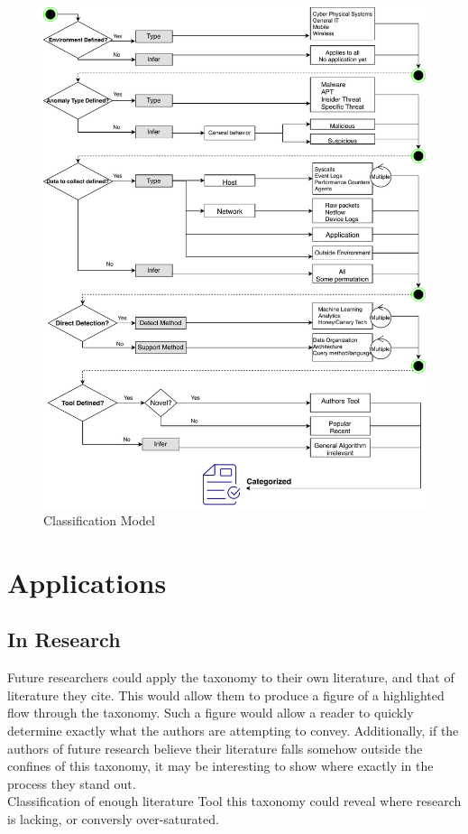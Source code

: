\documentclass[10pt]{IEEEtran}
\begin{document}
\begin{figure}
  \includegraphics[width=\textwidth]{logicdiagram.pdf}
  \caption{Classification Model}
\end{figure}

\section{Applications}
\subsection{In Research}
Future researchers could apply the taxonomy to their own literature, and that of literature they cite. This would allow them to produce a figure of a highlighted flow through the taxonomy. Such a figure would allow a reader to quickly determine exactly what the authors are attempting to convey. Additionally, if the authors of future research believe their literature falls somehow outside the confines of this taxonomy, it may be interesting to show where exactly in the process they stand out.\\ Classification of enough literature Tool this taxonomy could reveal where research is lacking, or conversly over-saturated. 
\end{document}
